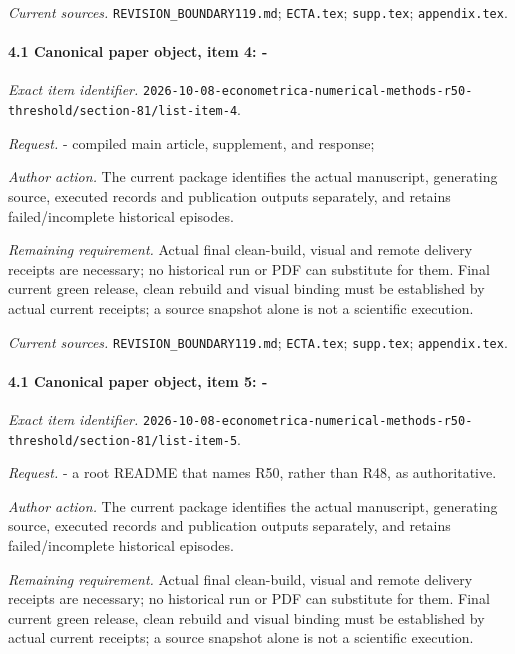 \par\emph{Current sources.} \nolinkurl{REVISION_BOUNDARY119.md}; \nolinkurl{ECTA.tex}; \nolinkurl{supp.tex}; \nolinkurl{appendix.tex}.

\paragraph{4.1 Canonical paper object, item 4: -}

\emph{Exact item identifier.} \nolinkurl{2026-10-08-econometrica-numerical-methods-r50-threshold/section-81/list-item-4}.

\par\emph{Request.} - compiled main article, supplement, and response;

\par\emph{Author action.} The current package identifies the actual manuscript, generating source, executed records and publication outputs separately, and retains failed/\allowbreak{}incomplete historical episodes.

\par\emph{Remaining requirement.} Actual final clean-build, visual and remote delivery receipts are necessary; no historical run or PDF can substitute for them. Final current green release, clean rebuild and visual binding must be established by actual current receipts; a source snapshot alone is not a scientific execution.

\par\emph{Current sources.} \nolinkurl{REVISION_BOUNDARY119.md}; \nolinkurl{ECTA.tex}; \nolinkurl{supp.tex}; \nolinkurl{appendix.tex}.

\paragraph{4.1 Canonical paper object, item 5: -}

\emph{Exact item identifier.} \nolinkurl{2026-10-08-econometrica-numerical-methods-r50-threshold/section-81/list-item-5}.

\par\emph{Request.} - a root README that names R50, rather than R48, as authoritative.

\par\emph{Author action.} The current package identifies the actual manuscript, generating source, executed records and publication outputs separately, and retains failed/\allowbreak{}incomplete historical episodes.

\par\emph{Remaining requirement.} Actual final clean-build, visual and remote delivery receipts are necessary; no historical run or PDF can substitute for them. Final current green release, clean rebuild and visual binding must be established by actual current receipts; a source snapshot alone is not a scientific execution.

